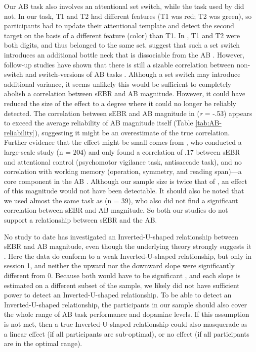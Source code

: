 \documentclass[11pt,]{memoir}
\begin{document}
Our AB task also involves an attentional set switch, while the task used by \textcite{Colzato2008} did not. In our task, T1 and T2 had different features (T1 was red; T2 was green), so participants had to update their attentional template and detect the second target on the basis of a different feature (color) than T1. In \textcite{Colzato2008}, T1 and T2 were both digits, and thus belonged to the same set. \textcite{Kelly2011} suggest that such a set switch introduces an additional bottle neck that is dissociable from the AB \autocite{Potter1998}. However, follow-up studies have shown that there is still a sizable correlation between non-switch and switch-versions of AB tasks \autocites{Dale2013}{Dale2013a}. Although a set switch may introduce additional variance, it seems unlikely this would be sufficient to completely abolish a correlation between sEBR and AB magnitude. However, it could have reduced the size of the effect to a degree where it could no longer be reliably detected. The correlation between sEBR and AB magnitude in \textcite{Colzato2008} (\emph{r} = -.53) appears to exceed the average reliability of AB magnitude itself (Table \ref{tab:AB-reliability}), suggesting it might be an overestimate of the true correlation. Further evidence that the effect might be small comes from \textcite{Unsworth2019}, who conducted a large-scale study (n = 204) and only found a correlation of .17 between sEBR and attentional control (psychomotor vigilance task, antisaccade task), and no correlation with working memory (operation, symmetry, and reading span)---a core component in the AB \autocites{Dux2009}{Martens2010}. Although our sample size is twice that of \textcite{Colzato2008}, an effect of this magnitude would not have been detectable. It should also be noted that we used almost the same task as \textcite{Slagter2013} (n = 39), who also did not find a significant correlation between sEBR and AB magnitude. So both our studies do not support a relationship between sEBR and the AB.

No study to date has investigated an Inverted-U-shaped relationship between sEBR and AB magnitude, even though the underlying theory strongly suggests it \autocites{Cools2011}{Slagter2012}. Here the data do conform to a weak Inverted-U-shaped relationship, but only in session 1, and neither the upward nor the downward slope were significantly different from 0. Because both would have to be significant \autocite{Simonsohn2018}, and each slope is estimated on a different subset of the sample, we likely did not have sufficient power to detect an Inverted-U-shaped relationship. To be able to detect an Inverted-U-shaped relationship, the participants in our sample should also cover the whole range of AB task performance and dopamine levels. If this assumption is not met, then a true Inverted-U-shaped relationship could also masquerade as a linear effect (if all participants are sub-optimal), or no effect (if all participants are in the optimal range).
\end{document}
